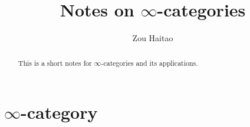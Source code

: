 \documentclass[a4,12pt]{amsart}
\title{Notes on $\infty$-categories}
\author{Zou Haitao}
\begin{document}
\begin{abstract}
    This is a short notes for $\infty$-categories and its applications.
\end{abstract}
\maketitle
\section{$\infty$-category}
  


\end{document}
